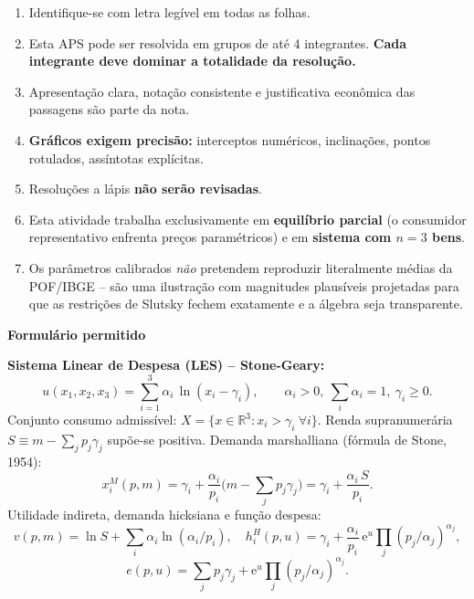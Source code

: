 \documentclass[11pt,addpoints]{exam}
\newcommand{\E}{\mathrm{e}}
\begin{document}
    \begin{enumerate}[noitemsep]
        \item Identifique-se com letra legível em todas as folhas.
        \item Esta APS pode ser resolvida em grupos de até 4 integrantes. \textbf{Cada integrante deve dominar a totalidade da resolução.}
        \item Apresentação clara, notação consistente e justificativa econômica das passagens são parte da nota.
        \item \textbf{Gráficos exigem precisão:} interceptos numéricos, inclinações, pontos rotulados, assíntotas explícitas.
        \item Resoluções a lápis \textbf{não serão revisadas}.
        \item Esta atividade trabalha exclusivamente em \textbf{equilíbrio parcial} (o consumidor representativo enfrenta preços paramétricos) e em \textbf{sistema com $n=3$ bens}.
        \item Os parâmetros calibrados \textit{não} pretendem reproduzir literalmente médias da POF/IBGE -- são uma ilustração com magnitudes plausíveis projetadas para que as restrições de Slutsky fechem exatamente e a álgebra seja transparente.
    \end{enumerate}


    \vspace{0.5em}
    \noindent\hrulefill

    \noindent\textbf{Formulário permitido}
    \vspace{0.3em}

    \textbf{Sistema Linear de Despesa (LES) -- Stone-Geary:}
    \[
        u(x_1, x_2, x_3) = \sum_{i=1}^{3} \alpha_i\, \ln(x_i - \gamma_i), \qquad \alpha_i > 0,\ \sum_i \alpha_i = 1,\ \gamma_i \geq 0.
    \]
    Conjunto consumo admissível: $X = \{x \in \mathbb{R}^3 : x_i > \gamma_i\ \forall i\}$. Renda supranumerária $S \equiv m - \sum_j p_j \gamma_j$ supõe-se positiva. Demanda marshalliana (fórmula de Stone, 1954):
    \[
        x_i^{M}(p, m) = \gamma_i + \frac{\alpha_i}{p_i}\bigl(m - \textstyle\sum_j p_j \gamma_j\bigr) = \gamma_i + \frac{\alpha_i\, S}{p_i}.
    \]
    Utilidade indireta, demanda hicksiana e função despesa:
    \[
        v(p, m) = \ln S + \sum_i \alpha_i \ln(\alpha_i/p_i),\quad
        h_i^{H}(p, u) = \gamma_i + \frac{\alpha_i}{p_i}\, \E^{u}\!\prod_j (p_j/\alpha_j)^{\alpha_j},
    \]
    \[
        e(p, u) = \sum_j p_j \gamma_j + \E^{u}\!\prod_j (p_j/\alpha_j)^{\alpha_j}.
    \]
\end{document}
